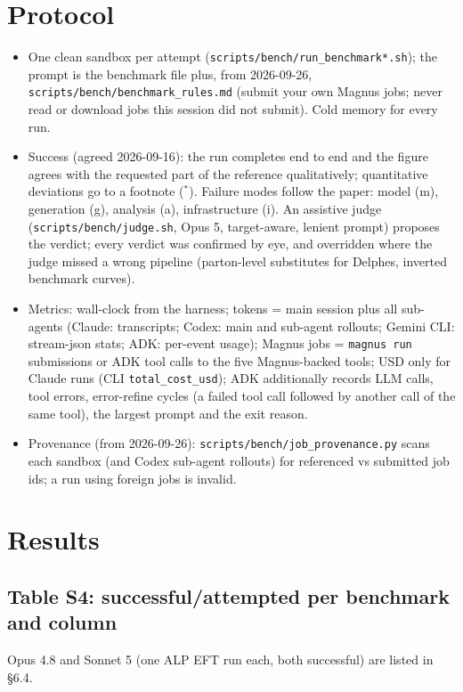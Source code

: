 \documentclass[10pt,a4paper]{article}
\newcommand{\code}[1]{\texttt{#1}}
\begin{document}
\section{Protocol}
\begin{itemize}
\item One clean sandbox per attempt (\code{scripts/bench/run\_benchmark*.sh}); the prompt is the benchmark file plus, from 2026-09-26, \code{scripts/bench/benchmark\_rules.md} (submit your own Magnus jobs; never read or download jobs this session did not submit). Cold memory for every run.
\item Success (agreed 2026-09-16): the run completes end to end and the figure agrees with the requested part of the reference qualitatively; quantitative deviations go to a footnote ($^{*}$). Failure modes follow the paper: model (m), generation (g), analysis (a), infrastructure (i). An assistive judge (\code{scripts/bench/judge.sh}, Opus 5, target-aware, lenient prompt) proposes the verdict; every verdict was confirmed by eye, and overridden where the judge missed a wrong pipeline (parton-level substitutes for Delphes, inverted benchmark curves).
\item Metrics: wall-clock from the harness; tokens = main session plus all sub-agents (Claude: transcripts; Codex: main and sub-agent rollouts; Gemini CLI: stream-json stats; ADK: per-event usage); Magnus jobs = \code{magnus run} submissions or ADK tool calls to the five Magnus-backed tools; USD only for Claude runs (CLI \code{total\_cost\_usd}); ADK additionally records LLM calls, tool errors, error-refine cycles (a failed tool call followed by another call of the same tool), the largest prompt and the exit reason.
\item Provenance (from 2026-09-26): \code{scripts/bench/job\_provenance.py} scans each sandbox (and Codex sub-agent rollouts) for referenced vs submitted job ids; a run using foreign jobs is invalid.
\end{itemize}

\section{Results}
\subsection{Table S4: successful/attempted per benchmark and column}
Opus 4.8 and Sonnet 5 (one ALP EFT run each, both successful) are listed in \S6.4.

\begin{center}\scriptsize\setlength{\tabcolsep}{4pt}\end{center}
\end{document}

